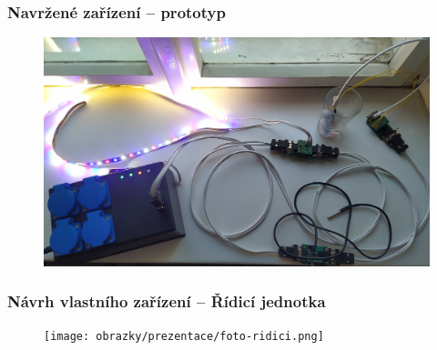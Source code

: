 \documentclass[%
  12pt,       				%
	t,                  %
	aspectratio=1610,   %
	unicode,						%
]{beamer}				    	%
\begin{document}
\begin{frame}[fragile]
	\frametitle{Navržené zařízení -- prototyp}
	\vspace{-0.5cm}
	\begin{figure}%
		\includegraphics[width=1\textwidth]{obrazky/prezentace/ukazka/system-cely.jpg}
	\end{figure}
\end{frame}

\begin{frame}[fragile]
	\frametitle{Návrh vlastního zařízení -- Řídicí jednotka}
	\vspace{-1cm}
	\begin{figure}%
		\texttt{[image: obrazky/prezentace/foto-ridici.png]}
	\end{figure}
\end{frame}
\end{document}
